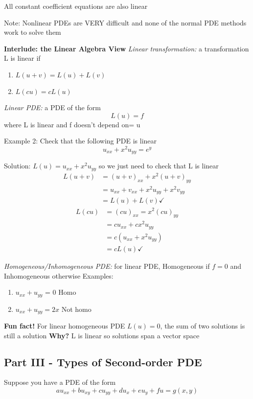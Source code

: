 \documentclass[12pt]{article}
\begin{document}
All constant coefficient equations are also linear 

Note: Nonlinear PDEs are VERY difficult and none of the normal PDE methods work to solve them

\textbf{Interlude: the Linear Algebra View}
\emph{Linear transformation:} a transformation L is linear if 
\begin{enumerate}
    \item $L(u + v) = L(u) + L(v)$
    \item $L(cu) = cL(u)$
\end{enumerate}

\emph{Linear PDE:} a PDE of the form 
\[L(u) = f\]
where L is linear and f doesn't depend on= u

Example 2: Check that the following PDE is linear 
\[u_{xx} + x^2u_{yy} = e^y\]

Solution: $L(u) = u_{xx} + x^2 u_{yy}$ so we just need to check that L is linear
\begin{align*}
    L(u + v) &= (u + v)_{xx} + x^2(u+v)_{yy}\\
    &= u_{xx} + v_{xx} + x^2 u_{yy} + x^2 v_{yy}\\
    &= L(u) + L(v) \checkmark
\end{align*}
\begin{align*}
    L(cu) &= (cu)_{xx} = x^2 (cu)_{yy}\\
    &= cu_{xx} + cx^2u_{yy}\\
    &= c(u_{xx} + x^2u_{yy})\\
    &= cL(u) \checkmark
\end{align*}

\emph{Homogeneous/Inhomogeneous PDE:} for linear PDE, Homogeneous if $f= 0$ and Inhomogeneous otherwise
Examples:
\begin{enumerate}
    \item $u_{xx} + u_{yy}$ = 0 \quad Homo
    \item $u_{xx} + u_{yy} = 2x$ \quad Not homo
\end{enumerate}

\textbf{Fun fact!}
For linear homogeneous PDE $L(u) = 0$, the sum of two solutions is still a solution
\textbf{Why?}
L is linear so solutions span a vector space

\subsection*{Part III - Types of Second-order PDE}
Suppose you have a PDE of the form
\[au_{xx} + bu_{xy} + cu_{yy} + du_x + eu_y + fu = g(x, y)\]
\end{document}
